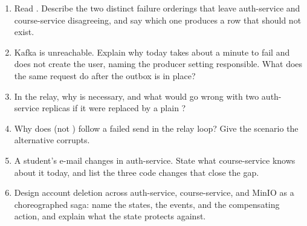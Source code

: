 \begin{quiz}
\begin{enumerate}
  \item Read . Describe the two distinct
  failure orderings that leave auth-service and course-service
  disagreeing, and say which one produces a row that should not exist.
  \item Kafka is unreachable. Explain why  today
  takes about a minute to fail and does not create the user, naming the
  producer setting responsible. What does the same request do after the
  outbox is in place?
  \item In the relay, why is  necessary,
  and what would go wrong with two auth-service replicas if it were
  replaced by a plain ?
  \item Why does  (not ) follow a failed
  send in the relay loop? Give the scenario the alternative corrupts.
  \item A student's e-mail changes in auth-service. State what
  course-service knows about it today, and list the three code changes
  that close the gap.
  \item Design account deletion across auth-service, course-service,
  and MinIO as a choreographed saga: name the states, the events, and
  the compensating action, and explain what the  state
  protects against.
\end{enumerate}
\end{quiz}
